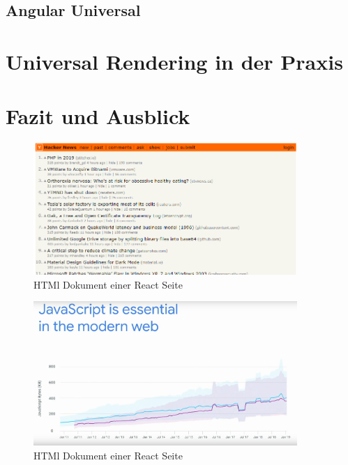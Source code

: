 \documentclass[runningheads]{llncs}
\begin{document}
\subsection{Angular Universal}
\label{subsec:Angular Universal}

\newpage

\section{Universal Rendering in der Praxis}
\label{sec:Universal Rendering in der Praxis}

\newpage

\section{Fazit und Ausblick}
\label{sec:Fazit}

\begin{figure}
  \centering
  \includegraphics[width=10cm]{images/HackerNews}
  \caption{HTMl Dokument einer React Seite}
\end{figure}

\begin{figure}
  \centering
  \includegraphics[width=10cm]{images/JavaScriptGoogleShips}
  \caption{HTMl Dokument einer React Seite}
\end{figure}




\newpage
%


\end{document}
